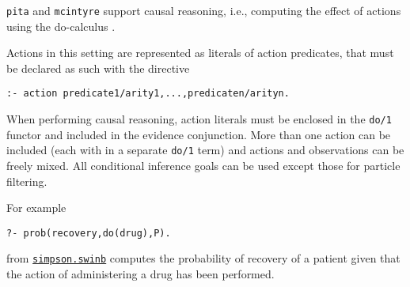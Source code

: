 \verb|pita| and \verb|mcintyre| support causal reasoning, i.e., computing the effect of actions using the
do-calculus \cite{Pea00-book}.

Actions in this setting are represented as literals of action predicates, that must be declared as such
with the directive 
\begin{verbatim}
:- action predicate1/arity1,...,predicaten/arityn.
\end{verbatim}
When performing causal reasoning, action literals must be enclosed in the \verb|do/1| functor and included in the evidence conjunction. More than one action can be included (each with in a separate
\verb|do/1| term) and actions and observations can be freely mixed.
All conditional inference goals can be used except those for particle filtering.

For example
\begin{verbatim} 
?- prob(recovery,do(drug),P).
\end{verbatim}
from \href{http://cplint.lamping.unife.it/example/inference/simpson.swinb}{\texttt{simpson.swinb}} 
computes the probability of recovery of a patient given that the action of administering a drug has
been performed.



